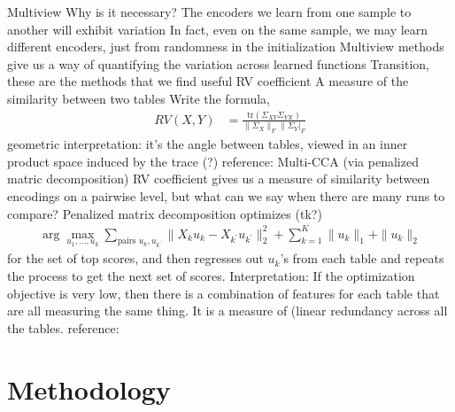 \documentclass[11pt]{article}
\begin{document}
\begin{outline}
\1 Multiview
  \2 Why is it necessary?
    \3 The encoders we learn from one sample to another will exhibit variation
      \4 In fact, even on the same sample, we may learn different encoders, just
      from randomness in the initialization
    \3 Multiview methods give us a way of quantifying the variation across
    learned functions
  \2 Transition, these are the methods that we find useful
  \2 RV coefficient
    \3 A measure of the similarity between two tables
    \3 Write the formula,
    \begin{align}
      RV\left(X, Y\right) &= \frac{\text{tr}\left(\Sigma_{XY}\Sigma_{YX}\right)}{\|\Sigma_{X}\|_{F}\|\Sigma_{Y}|_{F}}
    \end{align}
    \3 geometric interpretation: it's the angle between tables, viewed in an
    inner product space induced by the trace (?)
    \3 reference: \citep{josse2016measuring}
  \2 Multi-CCA (via penalized matric decomposition)
    \3 RV coefficient gives us a measure of similarity between encodings on a
    pairwise level, but what can we say when there are many runs to compare?
    \3 Penalized matrix decomposition optimizes (tk?)
    \begin{align}
      \arg\max_{u_1, \dots, u_{k}} \sum_{\text{pairs } u_{k}, u_{k^{\prime}}} \|X_{k}u_{k} - X_{k^{\prime}}u_{k^{\prime}}\|_{2}^{2} + \sum_{k = 1}^{K} \|u_{k}\|_{1} + \|u_{k}\|_{2}
    \end{align}
    for the set of top scores, and then regresses out $u_{k}$'s from each table
    and repeats the process to get the next set of scores.
    \3 Interpretation: If the optimization objective is very low, then there is
    a combination of features for each table that are all measuring the same
    thing. It is a measure of (linear redundancy across all the tables.
    \3 reference: \citep{witten2009penalized}
\end{outline}

\section{Methodology}
\end{document}
